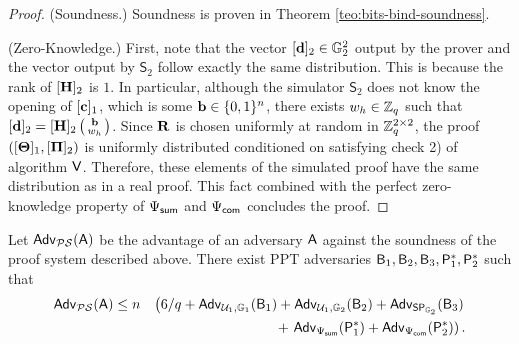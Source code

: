 \begin{proof}
(Soundness.) Soundness is proven in Theorem \ref{teo:bits-bind-soundness}.

(Zero-Knowledge.) First, note that the vector $[\mathbf{d}]_2 \in \mathbb{G}_2^2$ output by the prover and the vector output by $\mathsf{S}_2$ follow exactly the same distribution. This is because the rank of $[{\mathbf{{H}}}]_2$ is $1$. In particular, although the simulator $\mathsf{S}_2$ does not know the opening of $[\mathbf{c}]_1$, which is some $\mathbf{b} \in \{0,1\}^{n}$, 
there exists $w_h \in \mathbb{Z}_q$ such that $[\mathbf{d}]_2=[{\mathbf{{H}}}]_2\left(\begin{smallmatrix}\mathbf{b}\\ w_h\end{smallmatrix}\right)$. 
Since $\mathbf{{R}}$ is chosen uniformly at random in $\mathbb{Z}_q^{2 \times 2}$, the proof $([\mathbf{{\Theta}}]_1, [\mathbf{{\Pi}}]_2)$ is uniformly distributed conditioned on satisfying check 2) of algorithm $\mathsf{V}$.
Therefore, these elements of the simulated proof have the same distribution as in a real proof. This fact combined with the perfect zero-knowledge property of ${\Psi_{\mathsf{sum}}}$  and ${\Psi_{\mathsf{com}}}$ concludes the proof. 
\end{proof}
 
\begin{theorem} Let $\mathsf{Adv}_{\mathcal{PS}}(\mathsf{A})$ 
be the advantage of an adversary $\mathsf{A}$ against the soundness of 
the proof system  described above. There exist PPT adversaries
$\mathsf{B}_1,\mathsf{B}_2,\mathsf{B}_3,\mathsf{P}^*_1,\mathsf{P}^*_2$ such that 
\begin{eqnarray*}
\mathsf{Adv}_{\mathcal{PS}}(\mathsf{A}) & \leq 
n& \left(6/q+ \mathsf{Adv}_{\mathcal{U}_1,\mathbb{G}_1}(\mathsf{B}_1)
+  \mathsf{Adv}_{\mathcal{U}_1,\mathbb{G}_2}(\mathsf{B}_2)
+  \mathsf{Adv}_{\mathsf{SP}_{\mathbb{G}_2}}(\mathsf{B}_3)\right. \\
& & \mbox{ } 
+  \left.\mathsf{Adv}_{{\Psi_{\mathsf{sum}}}}(\mathsf{P}^*_1)
+
 \mathsf{Adv}_{{\Psi_{\mathsf{com}}}}(\mathsf{P}^*_2)\right).
\end{eqnarray*}
\label{teo:bits-bind-soundness}
\end{theorem}

